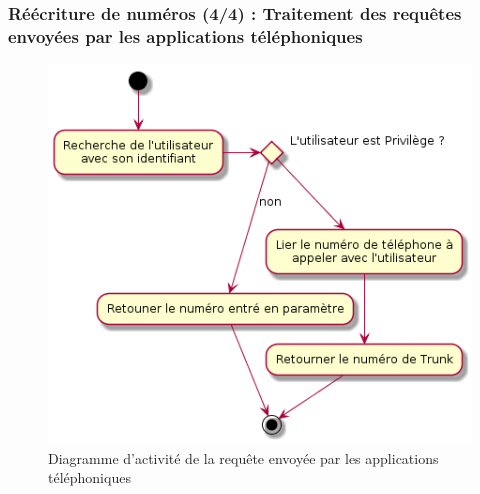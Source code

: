 \begin{frame}
	\frametitle{Réécriture de numéros (4/4) : Traitement des requêtes envoyées par les applications téléphoniques}

	\begin{center}
	  \begin{figure}
        \includegraphics[scale=0.30]{images/activity_rewrite_app.png}
	   \caption{Diagramme d'activité de la requête envoyée par les applications téléphoniques}
	  \end{figure}
	\end{center}
\end{frame}